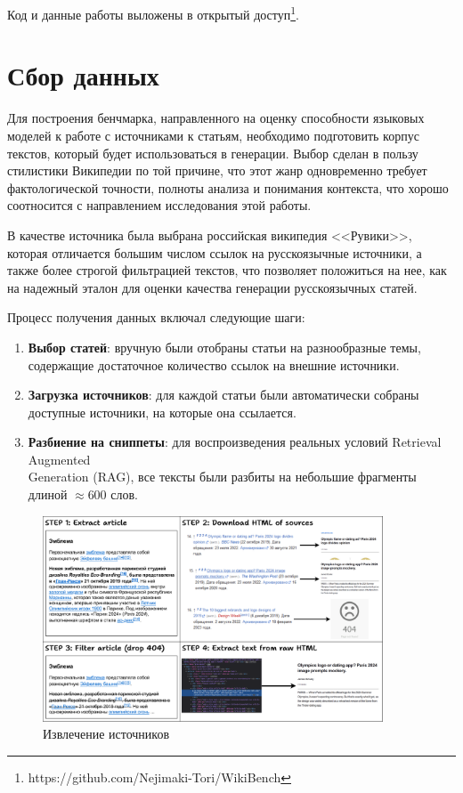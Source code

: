 \documentclass{article}
\begin{document}
Код и данные работы выложены в открытый доступ\footnote{https://github.com/Nejimaki-Tori/WikiBench}.

\section*{Сбор данных}

Для построения бенчмарка, направленного на оценку способности языковых моделей к работе с источниками к статьям, необходимо подготовить корпус текстов, который будет использоваться в генерации. 
Выбор сделан в пользу стилистики Википедии по той причине, что этот жанр одновременно требует фактологической точности, полноты анализа и понимания контекста, что хорошо соотносится с направлением исследования этой работы.

В качестве источника была выбрана российская википедия <<Рувики>>, которая отличается большим числом ссылок на русскоязычные источники, а также более строгой фильтрацией текстов, 
что позволяет положиться на нее, как на надежный эталон для оценки качества генерации русскоязычных статей.

Процесс получения данных включал следующие шаги:

\begin{enumerate}

    \item \textbf{Выбор статей}: вручную были отобраны статьи на разнообразные темы, 
    содержащие достаточное количество ссылок на внешние источники.
    
    \item \textbf{Загрузка источников}: для каждой статьи были автоматически собраны доступные источники, на которые она ссылается. 
    
    \item \textbf{Разбиение на сниппеты}: для воспроизведения реальных условий Retrieval Augmented \\Generation (RAG), 
    все тексты были разбиты на небольшие фрагменты длиной $\approx 600$ слов.

\end{enumerate}

\begin{figure}[ht!]
  \centering
  \includegraphics[width=0.9\textwidth]{figures/Source_extract.png}
  \caption{Извлечение источников}
  \label{fig:source}
\end{figure}
\end{document}
